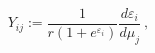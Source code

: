 \begin{equation}
Y_{ij}:=\frac{1}{r(1+e^{\varepsilon _{i}})}\frac{d\varepsilon _{i}}{d\mu _{j}%
}~,
\end{equation}%
